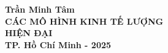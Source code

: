 \begin{titlepage}
  \thispagestyle{empty} %
  \begin{center}
      \vspace*{1cm} %
      {\fontsize{13pt}{15pt} \selectfont \textbf{Trần Minh Tâm}} \\[8cm]
      {\LARGE \textbf{CÁC MÔ HÌNH KINH TẾ LƯỢNG}} \\[0.5cm]
      {\LARGE \textbf{HIỆN ĐẠI}} \\[10cm]
      {\fontsize{13pt}{15pt} \selectfont \textbf{TP. Hồ Chí Minh - 2025}}
  \end{center}
\end{titlepage}

\clearpage
\thispagestyle{empty}
\setcounter{page}{1} %
